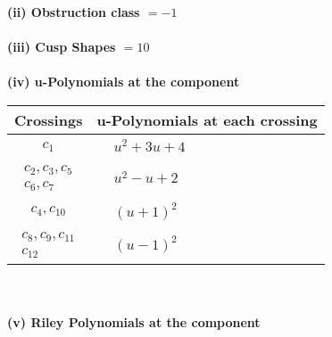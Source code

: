 \documentclass[1p]{elsarticle_modified}
\theoremstyle{definition}
\begin{document}
\flushleft \textbf{(ii) Obstruction class $= -1$}\\~\\
\flushleft \textbf{(iii) Cusp Shapes $= 10$}\\~\\
\newpage\renewcommand{\arraystretch}{1}
\flushleft \textbf{(iv) u-Polynomials at the component}\newline \\
\begin{tabular}{m{50pt}|m{274pt}}
Crossings & \hspace{64pt}u-Polynomials at each crossing \\
\hline $$\begin{aligned}c_{1}\end{aligned}$$&$\begin{aligned}
&u^2+3 u+4
\end{aligned}$\\
\hline $$\begin{aligned}c_{2},c_{3},c_{5}\\c_{6},c_{7}\end{aligned}$$&$\begin{aligned}
&u^2- u+2
\end{aligned}$\\
\hline $$\begin{aligned}c_{4},c_{10}\end{aligned}$$&$\begin{aligned}
&(u+1)^2
\end{aligned}$\\
\hline $$\begin{aligned}c_{8},c_{9},c_{11}\\c_{12}\end{aligned}$$&$\begin{aligned}
&(u-1)^2
\end{aligned}$\\
\hline
\end{tabular}\\~\\
\newpage\renewcommand{\arraystretch}{1}
\flushleft \textbf{(v) Riley Polynomials at the component}\newline \\
\end{document}
